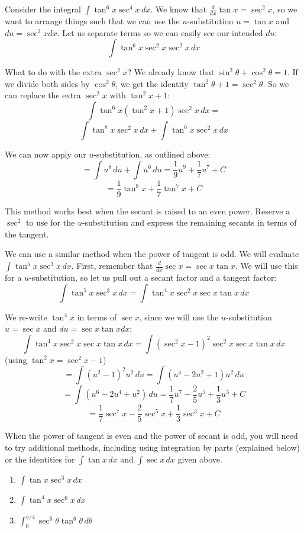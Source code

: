 Consider the integral $\int \tan^6{x} \sec^4{x}\,dx$. We know that $\frac{d}{dx}
\tan{x} = \sec^2{x}$, so we want to arrange things such that we can use the 
$u$-substitution $u = \tan{x}$ and $du = \sec^2{x} dx$. Let us separate terms so
we can easily see our intended $du$:
$$\int \tan^6{x} \sec^2{x} \sec^2{x}\,dx$$

What to do with the extra $\sec^2{x}$? We already know that $\sin^2{\theta} + 
\cos^2{\theta} = 1$. If we divide both sides by $\cos^2{\theta}$, we get the 
identity $\tan^2{\theta} + 1 = \sec^2{\theta}$. So we can replace the extra 
$\sec^2{x}$ with $\tan^2{x} + 1$:
$$\int \tan^6{x} \left( \tan^2{x} + 1 \right) \sec^2{x}\,dx = $$
$$\int \tan^8{x} \sec^2{x}\,dx + \int \tan^6{x} \sec^2{x}\,dx$$

We can now apply our $u$-substitution, as outlined above:
$$= \int u^8\,du + \int u^6\,du = \frac{1}{9}u^9 + \frac{1}{7}u^7 + C$$
$$= \frac{1}{9}\tan^9{x} + \frac{1}{7}\tan^7{x} + C$$

This method works best when the secant is raised to an even power. Reserve a 
$\sec^2$ to use for the $u$-substitution and express the remaining secants in 
terms of the tangent. 

We can use a similar method when the power of tangent is odd. We will evaluate 
$\int \tan^5{x} \sec^3{x}\,dx$. First, remember that $\frac{d}{dx} \sec{x} = 
\sec{x} \tan{x}$. We will use this for a $u$-substitution, so let us pull out a 
secant factor and a tangent factor:
$$\int \tan^5{x} \sec^3{x}\,dx = \int \tan^4{x} \sec^2{x} \sec{x} \tan{x}\,dx$$

We re-write $\tan^4{x}$ in terms of $\sec{x}$, since we will use the 
$u$-substitution $u = \sec{x}$ and $du = \sec{x} \tan{x} dx$:
$$\int \tan^4{x} \sec^2{x} \sec{x} \tan{x}\,dx = \int \left( \sec^2{x} - 1 
\right)^2 \sec^2{x} \sec{x} \tan{x}\,dx$$
(using $\tan^2{x} = \sec^2{x} - 1$)
$$= \int \left( u^2 - 1 \right)^2 u^2\,du = \int \left(u^4 - 2u^2 + 1 \right) 
u^2\,du$$
$$= \int \left( u^6 - 2u^4 + u^2 \right)\,du = \frac{1}{7}u^7 - \frac{2}{5}u^5 
+ \frac{1}{3}u^3 + C$$
$$= \frac{1}{7}\sec^7{x} - \frac{2}{5}\sec^5{x} + \frac{1}{3}\sec^3{x} + C$$

When the power of tangent is even and the power of secant is odd, you will 
need to try additional methods, including using integration by parts (explained 
below) or the identities for $\int \tan{x}\,dx$ and $\int \sec{x}\,dx$ given 
above. 

\begin{Exercise}[title = {Integrating Powers of Secant and Tangent}, 
label = power_3]
\begin{enumerate}
\item $\int \tan{x} \sec^3{x}\,dx$
\item $\int \tan^4{x} \sec^6{x}\,dx$
\item $\int_0^{\pi/4} \sec^6{\theta} \tan^6{\theta}\,d\theta$
\end{enumerate}
\end{Exercise}

